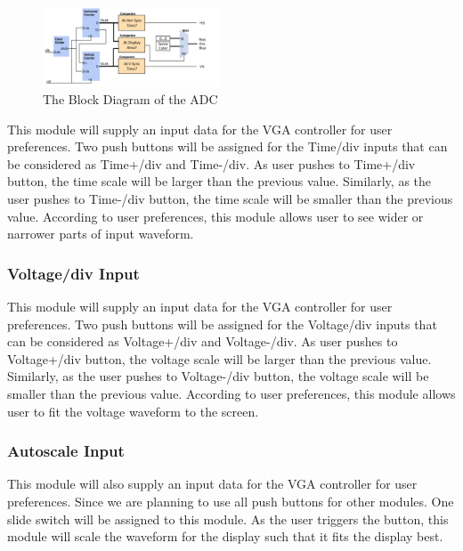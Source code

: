 \documentclass[paper]{IEEEtran}
\begin{document}
\begin{figure}[h!]
			\setlength{\unitlength}{\textwidth}
			\center 
			\includegraphics[width=0.47\textwidth]{vga_controller}
			\caption{\label{fig:vga_controller}The Block Diagram of the ADC}
\end{figure}
		
			
	This module will supply an input data for the VGA controller for user preferences. Two push buttons will be assigned for the Time/div inputs that can be considered as Time+/div and Time-/div. As user pushes to Time+/div button, the time scale will be larger than the previous value. Similarly, as the user pushes to Time-/div button, the time scale will be smaller than the previous value. According to user preferences, this module allows user to see wider or narrower parts of input waveform.
	  
\subsubsection{Voltage/div Input} \- \indent

	This module will supply an input data for the VGA controller for user preferences. Two push buttons will be assigned for the Voltage/div inputs that can be considered as Voltage+/div and Voltage-/div. As user pushes to Voltage+/div button, the voltage scale will be larger than the previous value. Similarly, as the user pushes to Voltage-/div button, the voltage scale will be smaller than the previous value. According to user preferences, this module allows user to fit the voltage waveform to the screen.
	
\subsubsection{Autoscale Input} \- \indent

	This module will also supply an input data for the VGA controller for user preferences. Since we are planning to use all push buttons for other modules. One slide switch will be assigned to this module. As the user triggers the button, this module will scale the waveform for the display such that it fits the display best.
\end{document}
